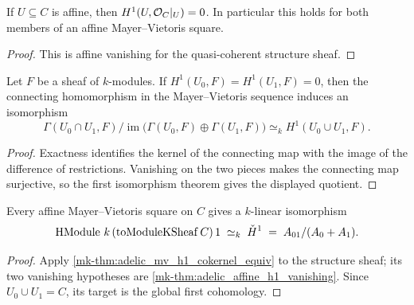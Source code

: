 \begin{proposition}
  \label{mk-thm:adelic_affine_h1_vanishing}
  \leanok

  If \(U\subseteq C\) is affine, then
  \(H^1(U,\mathcal{O}_{C}|_U)=0\).  In particular this holds for both members
  of an affine Mayer--Vietoris square.
\end{proposition}
\begin{proof}
  \leanok
  This is affine vanishing for the quasi-coherent structure sheaf.
\end{proof}

\begin{proposition}
  \label{mk-thm:adelic_mv_h1_cokernel_equiv}
  \leanok

  Let \(F\) be a sheaf of \(k\)-modules.  If
  \(H^1(U_0,F)=H^1(U_1,F)=0\), then the connecting homomorphism in the
  Mayer--Vietoris sequence induces an isomorphism
  \[
    \Gamma(U_0\cap U_1,F)/
      \operatorname{im}\bigl(\Gamma(U_0,F)\oplus\Gamma(U_1,F)\bigr)
      \simeq_k H^1(U_0\cup U_1,F).
  \]
\end{proposition}
\begin{proof}
  \leanok
  Exactness identifies the kernel of the connecting map with the image of
  the difference of restrictions.  Vanishing on the two pieces makes the
  connecting map surjective, so the first isomorphism theorem gives the
  displayed quotient.
\end{proof}

\begin{theorem}
  \label{mk-thm:adelic_HModuleOne_linearEquiv_cokernel}
  \leanok

  Every affine Mayer--Vietoris square on \(C\) gives a \(k\)-linear
  isomorphism
  \[
    \operatorname{HModule}\, k\, (\operatorname{toModuleKSheaf} C)\, 1
    \;\simeq_k\; \check{H}^1 \;=\; A_{01}/(A_0 + A_1).
  \]
\end{theorem}
\begin{proof}
  \leanok
  Apply \ref{mk-thm:adelic_mv_h1_cokernel_equiv} to the structure sheaf;
  its two vanishing hypotheses are \ref{mk-thm:adelic_affine_h1_vanishing}.
  Since \(U_0\cup U_1=C\), its target is the global first cohomology.
\end{proof}


